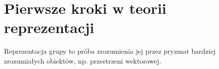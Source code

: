 \chapter{Pierwsze kroki w teorii reprezentacji}


Reprezentacja grupy to próba zrozumienia jej przez pryzmat bardziej zrozumiałych obiektów, np. przestrzeni wektorowej.








